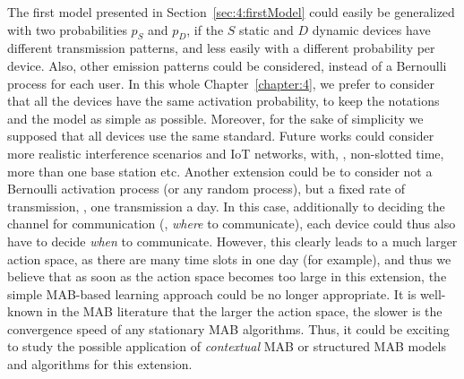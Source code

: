 The first model presented in Section~\ref{sec:4:firstModel} could easily be generalized with two probabilities $p_S$ and $p_D$, if the $S$ static and $D$ dynamic devices have different transmission patterns, and less easily with a different probability per device.
Also, other emission patterns could be considered, instead of a Bernoulli process for each user.
In this whole Chapter~\ref{chapter:4}, we prefer to consider that all the devices have the same activation probability, to keep the notations and the model as simple as possible.
%
Moreover, for the sake of simplicity we supposed that all devices use the same standard.
Future works could consider more realistic interference scenarios and IoT networks, with, \eg, non-slotted time, more than one base station etc.
Another extension could be to consider not a Bernoulli activation process (or any random process), but a fixed rate of transmission, \eg, one transmission a day.
In this case, additionally to deciding the channel for communication (\ie, \emph{where} to communicate), each device could thus also have to decide \emph{when} to communicate.
However, this clearly leads to a much larger action space, as there are many time slots in one day (for example), and thus we believe that as soon as the action space becomes too large in this extension, the simple MAB-based learning approach could be no longer appropriate.
It is well-known in the MAB literature that the larger the action space, the slower is the convergence speed of any stationary MAB algorithms.
Thus, it could be exciting to study the possible application of \emph{contextual} MAB \cite{Li10,Luo18} or structured MAB \cite{Combes17} models and algorithms for this extension.
%
%
%
